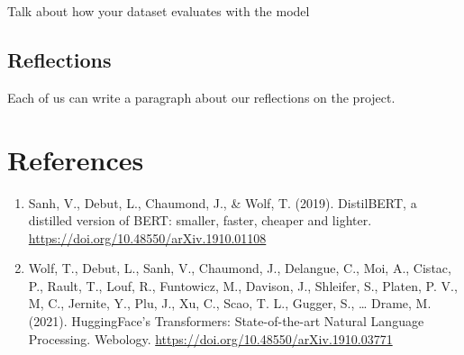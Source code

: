 \documentclass[
  11pt,
]{article}
\begin{document}
Talk about how your dataset evaluates with the model

\subsection{Reflections}\label{reflections}

Each of us can write a paragraph about our reflections on the project.

\section{References}\label{references}

\begin{enumerate}
\def\labelenumi{\arabic{enumi}.}
\item
  Sanh, V., Debut, L., Chaumond, J., \& Wolf, T. (2019). DistilBERT, a
  distilled version of BERT: smaller, faster, cheaper and lighter.
  \url{https://doi.org/10.48550/arXiv.1910.01108}
\item
  Wolf, T., Debut, L., Sanh, V., Chaumond, J., Delangue, C., Moi, A.,
  Cistac, P., Rault, T., Louf, R., Funtowicz, M., Davison, J., Shleifer,
  S., Platen, P. V., M, C., Jernite, Y., Plu, J., Xu, C., Scao, T. L.,
  Gugger, S., \ldots{} Drame, M. (2021). HuggingFace's Transformers:
  State-of-the-art Natural Language Processing. Webology.
  \url{https://doi.org/10.48550/arXiv.1910.03771}
\end{enumerate}
\end{document}
